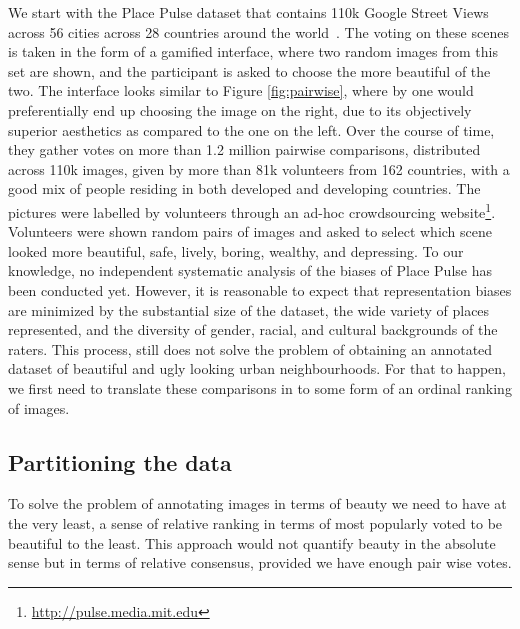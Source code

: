 We start with the  Place Pulse dataset that contains 110k Google Street Views across 56 cities across 28 countries around the world~\cite{dubey2016deep}. The voting on these scenes is taken in the form of a gamified interface, where two random images from this set are shown, and the participant is asked to choose the more beautiful of the two. The interface looks similar to Figure \ref{fig:pairwise}, where by one would preferentially end up choosing the image on the right, due to its objectively superior aesthetics as compared to the one on the left. Over the course of time, they gather votes on more than 1.2 million pairwise comparisons, distributed  across 110k images, given by more than 81k volunteers from 162 countries, with a good mix of people residing in both developed and developing countries.
The pictures were labelled by volunteers through an ad-hoc crowdsourcing website\footnote{\url{http://pulse.media.mit.edu}}. Volunteers were shown random pairs of images and asked to select which scene looked more beautiful, safe, lively, boring, wealthy, and depressing.  To our knowledge, no independent systematic analysis of the biases of Place Pulse has been conducted yet. However, it is reasonable to expect that representation biases are minimized by the substantial size of the dataset, the wide variety of places represented, and the diversity of gender, racial, and cultural backgrounds of the raters.
This process, still does not solve the problem of obtaining an annotated dataset of beautiful and ugly looking urban neighbourhoods. For that to happen, we first need to translate these comparisons in to some form of an ordinal ranking of images.

\subsection{Partitioning the data}
To solve the problem of annotating images in terms of beauty we need to have at the very least, a sense of relative ranking in terms of most popularly voted to be beautiful to the least. This approach would not quantify beauty in the absolute sense but in terms of relative consensus, provided we have enough pair wise votes. 
 
